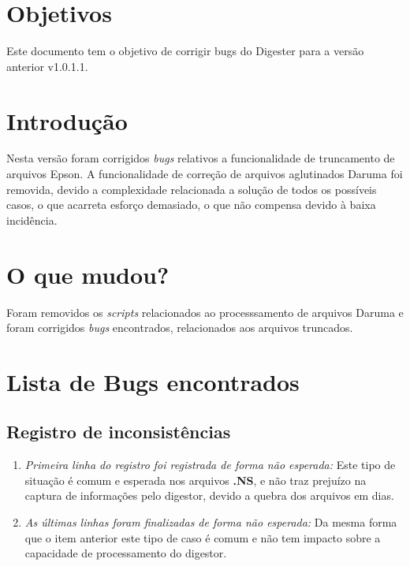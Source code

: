 \documentclass{article}      %
\begin{document}
\section{Objetivos}

Este documento tem o objetivo de corrigir bugs do Digester para a versão anterior v1.0.1.1. 


\section{Introdução}     
Nesta versão foram corrigidos \emph{bugs} relativos a funcionalidade de truncamento de arquivos Epson. A funcionalidade de correção de arquivos aglutinados Daruma foi removida, devido a complexidade relacionada a solução de todos os possíveis casos, o que acarreta esforço demasiado, o que não compensa devido à baixa incidência.

\section{O que mudou?}
Foram removidos os \emph{scripts} relacionados ao processsamento de arquivos Daruma e foram corrigidos \emph{bugs} encontrados, relacionados aos arquivos truncados.

\section{Lista de Bugs encontrados}
\subsection{Registro de inconsistências}
\begin{enumerate}
    \item \emph{Primeira linha do registro foi registrada de forma não esperada:} Este tipo de situação é comum e esperada nos arquivos \textbf{.NS}, e não traz prejuízo na captura de informações pelo digestor, devido a quebra dos arquivos em dias. 
    \item \emph{As últimas linhas foram finalizadas de forma não esperada:} Da mesma forma que o item anterior este tipo de caso é comum e não tem impacto sobre a capacidade de processamento do digestor.
\end{enumerate}
\end{document}
